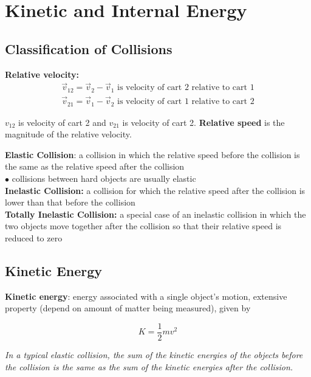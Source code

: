 \section{Kinetic and Internal Energy}

    \subsection{Classification of Collisions}


        \textbf{Relative velocity:}
        \begin{align*}
            \overrightarrow{v}_{12} = \overrightarrow{v}_2 - \overrightarrow{v}_1 \text{ is velocity of cart 2 relative to cart 1} \\
            \overrightarrow{v}_{21} = \overrightarrow{v}_1 - \overrightarrow{v}_2 \text{ is velocity of cart 1 relative to cart 2}
        \end{align*}

        $v_{12}$ is velocity of cart 2 and $v_{21}$ is velocity of cart 2. \textbf{Relative speed} is the magnitude of the relative velocity.

        \textbf{Elastic Collision}: a collision in which the relative speed before the collision is the same as the relative speed after the collision \\
        $\bullet$ collisions between hard objects are usually elastic \\

        \textbf{Inelastic Collision:} a collision for which the relative speed after the collision is lower than that before the collision \\
        \textbf{Totally Inelastic Collision:} a special case of an inelastic collision in which the two objects move together after the collision so that their relative speed is reduced to zero \\



    \subsection{Kinetic Energy}

        \textbf{Kinetic energy}: energy associated with a single object's motion, extensive property (depend on amount of matter being measured), given by

        \[
            K = \frac{1}{2} mv^2
        \]

        \textit{In a typical elastic collision, the sum of the kinetic energies of the objects before the collision is the same as the sum of the kinetic energies after the collision.} \\

